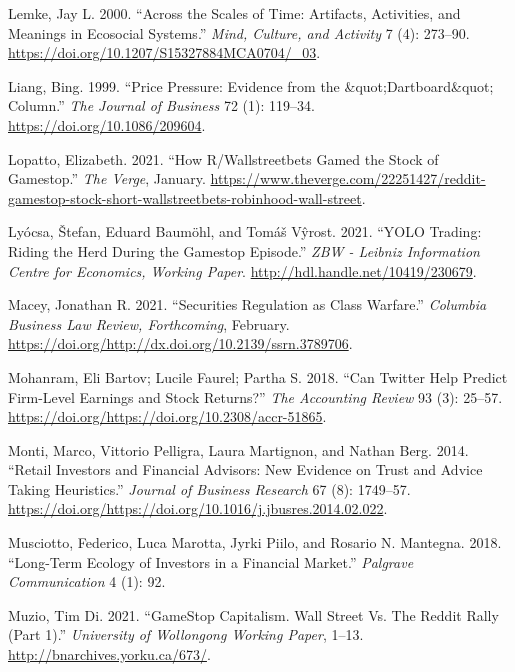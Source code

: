 \documentclass[12pt,]{article}
\begin{document}
\leavevmode\hypertarget{ref-lemke}{}%
Lemke, Jay L. 2000. ``Across the Scales of Time: Artifacts, Activities,
and Meanings in Ecosocial Systems.'' \emph{Mind, Culture, and Activity}
7 (4): 273--90. \url{https://doi.org/10.1207/S15327884MCA0704/_03}.

\leavevmode\hypertarget{ref-liang1999}{}%
Liang, Bing. 1999. ``Price Pressure: Evidence from the
\&quot;Dartboard\&quot; Column.'' \emph{The Journal of Business} 72 (1):
119--34. \url{https://doi.org/10.1086/209604}.

\leavevmode\hypertarget{ref-lopatto2021}{}%
Lopatto, Elizabeth. 2021. ``How R/Wallstreetbets Gamed the Stock of
Gamestop.'' \emph{The Verge}, January.
\url{https://www.theverge.com/22251427/reddit-gamestop-stock-short-wallstreetbets-robinhood-wall-street}.

\leavevmode\hypertarget{ref-lyocsa2021}{}%
Lyócsa, Štefan, Eduard Baumöhl, and Tomáš Vŷrost. 2021. ``YOLO Trading:
Riding the Herd During the Gamestop Episode.'' \emph{ZBW - Leibniz
Information Centre for Economics, Working Paper}.
\url{http://hdl.handle.net/10419/230679}.

\leavevmode\hypertarget{ref-macey2021}{}%
Macey, Jonathan R. 2021. ``Securities Regulation as Class Warfare.''
\emph{Columbia Business Law Review, Forthcoming}, February.
\url{https://doi.org/http://dx.doi.org/10.2139/ssrn.3789706}.

\leavevmode\hypertarget{ref-bartov2018}{}%
Mohanram, Eli Bartov; Lucile Faurel; Partha S. 2018. ``Can Twitter Help
Predict Firm-Level Earnings and Stock Returns?'' \emph{The Accounting
Review} 93 (3): 25--57.
\url{https://doi.org/https://doi.org/10.2308/accr-51865}.

\leavevmode\hypertarget{ref-monti2014}{}%
Monti, Marco, Vittorio Pelligra, Laura Martignon, and Nathan Berg. 2014.
``Retail Investors and Financial Advisors: New Evidence on Trust and
Advice Taking Heuristics.'' \emph{Journal of Business Research} 67 (8):
1749--57.
\url{https://doi.org/https://doi.org/10.1016/j.jbusres.2014.02.022}.

\leavevmode\hypertarget{ref-musciotto2018}{}%
Musciotto, Federico, Luca Marotta, Jyrki Piilo, and Rosario N. Mantegna.
2018. ``Long-Term Ecology of Investors in a Financial Market.''
\emph{Palgrave Communication} 4 (1): 92.

\leavevmode\hypertarget{ref-dimuzio2021}{}%
Muzio, Tim Di. 2021. ``GameStop Capitalism. Wall Street Vs. The Reddit
Rally (Part 1).'' \emph{University of Wollongong Working Paper}, 1--13.
\url{http://bnarchives.yorku.ca/673/}.
\end{document}

